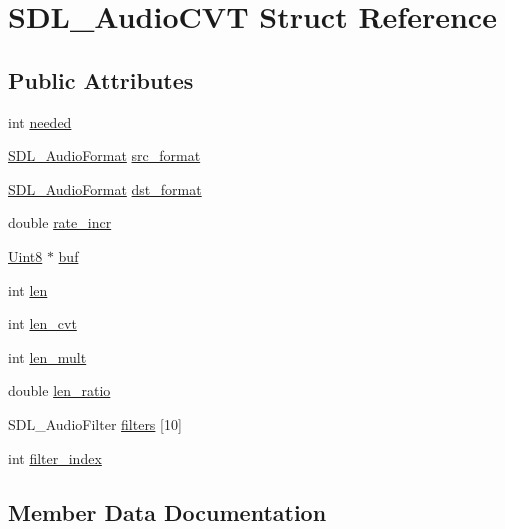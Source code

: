 \hypertarget{struct_s_d_l___audio_c_v_t}{}\section{S\+D\+L\+\_\+\+Audio\+C\+VT Struct Reference}
\label{struct_s_d_l___audio_c_v_t}
\subsection*{Public Attributes}
\begin{DoxyCompactItemize}
\item 
int \hyperlink{struct_s_d_l___audio_c_v_t_ac600a035a48df05e14d3712fd6953ad4}{needed}
\item 
\hyperlink{_s_d_l__audio_8h_a491ed103fd25d920c4e6b7495217ce66}{S\+D\+L\+\_\+\+Audio\+Format} \hyperlink{struct_s_d_l___audio_c_v_t_a6ae81231e017105e6d5e745a51732e16}{src\+\_\+format}
\item 
\hyperlink{_s_d_l__audio_8h_a491ed103fd25d920c4e6b7495217ce66}{S\+D\+L\+\_\+\+Audio\+Format} \hyperlink{struct_s_d_l___audio_c_v_t_a8f890d017be857a3b048bf00525736c6}{dst\+\_\+format}
\item 
double \hyperlink{struct_s_d_l___audio_c_v_t_ad886122c23a6673073baace31bff3b6c}{rate\+\_\+incr}
\item 
\hyperlink{_s_d_l__stdinc_8h_a2944638813a090aa23e62f4da842c3e2}{Uint8} $\ast$ \hyperlink{struct_s_d_l___audio_c_v_t_a080db27b929efa983c5161360ffce310}{buf}
\item 
int \hyperlink{struct_s_d_l___audio_c_v_t_aeaeb8c5a63c3ab96471fbfdf412c78ff}{len}
\item 
int \hyperlink{struct_s_d_l___audio_c_v_t_a5c60163f34d1947e5b166c23aba9879d}{len\+\_\+cvt}
\item 
int \hyperlink{struct_s_d_l___audio_c_v_t_ac9662d47cf2348b82b27b151150116b0}{len\+\_\+mult}
\item 
double \hyperlink{struct_s_d_l___audio_c_v_t_a5628ff5ccf711de9d77c0a4a9f57d2f0}{len\+\_\+ratio}
\item 
S\+D\+L\+\_\+\+Audio\+Filter \hyperlink{struct_s_d_l___audio_c_v_t_aeec0ebddc5e142bbafcc94a6014ad23e}{filters} \mbox{[}10\mbox{]}
\item 
int \hyperlink{struct_s_d_l___audio_c_v_t_a35093b3ad3331c17416c593a76012b63}{filter\+\_\+index}
\end{DoxyCompactItemize}


\subsection{Member Data Documentation}
\mbox{\label{struct_s_d_l___audio_c_v_t_a080db27b929efa983c5161360ffce310}} 
